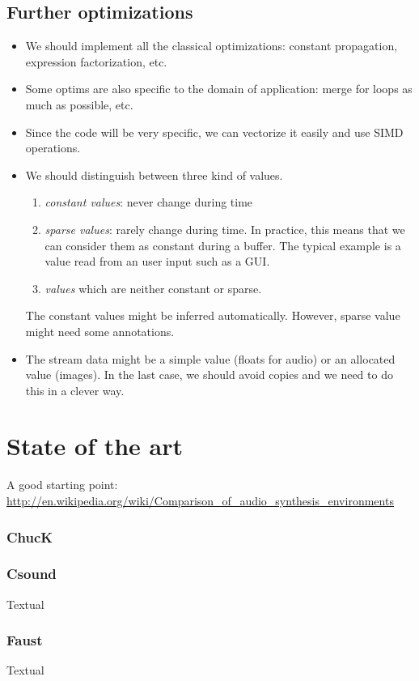 \documentclass{article}
\begin{document}
\subsection{Further optimizations}
\begin{itemize}
\item We should implement all the classical optimizations: constant propagation,
  expression factorization, etc.
\item Some optims are also specific to the domain of application: merge for
  loops as much as possible, etc.
\item Since the code will be very specific, we can vectorize it easily and use
  SIMD operations.
\item We should distinguish between three kind of values.
  \begin{enumerate}
  \item \emph{constant values}: never change during time
  \item \emph{sparse values}: rarely change during time. In practice, this means
    that we can consider them as constant during a buffer. The typical example
    is a value read from an user input such as a GUI.
  \item \emph{values} which are neither constant or sparse.
  \end{enumerate}
  The constant values might be inferred automatically. However, sparse value
  might need some annotations.
\item The stream data might be a simple value (floats for audio) or an allocated
  value (images). In the last case, we should avoid copies and we need to do
  this in a clever way.
\end{itemize}

\section{State of the art}
A good starting point:
\url{http://en.wikipedia.org/wiki/Comparison_of_audio_synthesis_environments}

\subsubsection{ChucK}

\subsubsection{Csound}
\cite{csound}
Textual

\subsubsection{Faust}
\cite{faust}
Textual
\end{document}
